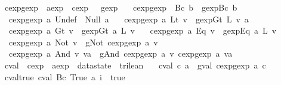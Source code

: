 \begin{isabellebody}
\isanewline
{}\isamarkupfalse%
\ cexp{}gexp\ {\isacharcolon}{\isacharcolon}\ {\isachardoublequoteopen}aexp\ {\isasymRightarrow}\ cexp\ {\isasymRightarrow}\ \ gexp{\isachardoublequoteclose}\ \isanewline
\ \ {\isachardoublequoteopen}cexp{}gexp\ {\isacharunderscore}\ {\isacharparenleft}Bc\ b{\isacharparenright}\ {\isacharequal}\ gexp{\isachardot}Bc\ b{\isachardoublequoteclose}\ {\isacharbar}\isanewline
\ \ {\isachardoublequoteopen}cexp{}gexp\ a\ Undef\ {\isacharequal}\ Null\ a{\isachardoublequoteclose}\ {\isacharbar}\isanewline
\ \ {\isachardoublequoteopen}cexp{}gexp\ a\ {\isacharparenleft}Lt\ v{\isacharparenright}\ {\isacharequal}\ gexp{\isachardot}Gt\ {\isacharparenleft}L\ v{\isacharparenright}\ a{\isachardoublequoteclose}\ {\isacharbar}\isanewline
\ \ {\isachardoublequoteopen}cexp{}gexp\ a\ {\isacharparenleft}Gt\ v{\isacharparenright}\ {\isacharequal}\ gexp{\isachardot}Gt\ a\ {\isacharparenleft}L\ v{\isacharparenright}{\isachardoublequoteclose}\ {\isacharbar}\isanewline
\ \ {\isachardoublequoteopen}cexp{}gexp\ a\ {\isacharparenleft}Eq\ v{\isacharparenright}\ {\isacharequal}\ gexp{\isachardot}Eq\ a\ {\isacharparenleft}L\ v{\isacharparenright}{\isachardoublequoteclose}\ {\isacharbar}\isanewline
\ \ {\isachardoublequoteopen}cexp{}gexp\ a\ {\isacharparenleft}Not\ v{\isacharparenright}\ {\isacharequal}\ gNot\ {\isacharparenleft}cexp{}gexp\ a\ v{\isacharparenright}{\isachardoublequoteclose}\ {\isacharbar}\isanewline
\ \ {\isachardoublequoteopen}cexp{}gexp\ a\ {\isacharparenleft}And\ v\ va{\isacharparenright}\ {\isacharequal}\ gAnd\ {\isacharparenleft}cexp{}gexp\ a\ v{\isacharparenright}\ {\isacharparenleft}cexp{}gexp\ a\ va{\isacharparenright}{\isachardoublequoteclose}\isanewline
\isanewline
{}\isamarkupfalse%
\ cval\ {\isacharcolon}{\isacharcolon}\ {\isachardoublequoteopen}cexp\ {\isasymRightarrow}\ aexp\ {\isasymRightarrow}\ {\isacharparenleft}datastate\ {\isasymRightarrow}\ trilean{\isacharparenright}{\isachardoublequoteclose}\ \isanewline
\ \ {\isachardoublequoteopen}cval\ c\ a\ {\isacharequal}\ gval\ {\isacharparenleft}cexp{}gexp\ a\ c{\isacharparenright}{\isachardoublequoteclose}\isanewline
\isanewline
{}\isamarkupfalse%
\ cval{\isacharunderscore}true{\isacharcolon}\ {\isachardoublequoteopen}cval\ {\isacharparenleft}Bc\ True{\isacharparenright}\ a\ i\ {\isacharequal}\ true{\isachardoublequoteclose}\isanewline
%
\isadelimproof
\ \ %

\end{isabellebody}
